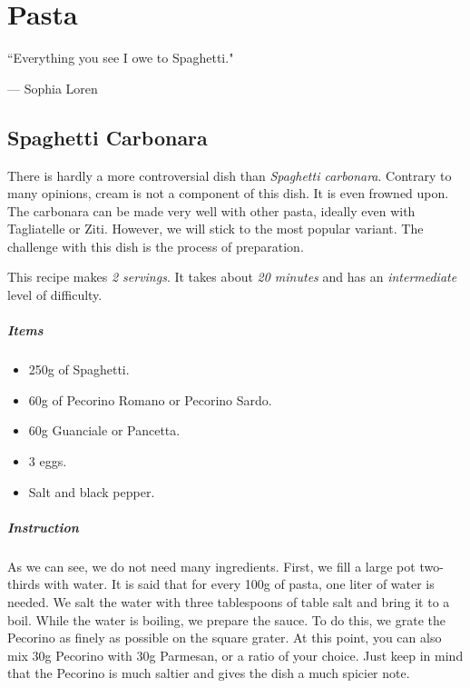\chapter{Pasta}
\label{pasta}
\epigraph{``Everything you see I owe to Spaghetti."}{--- \textup{Sophia Loren}}

\section{Spaghetti Carbonara}
\label{Spaghetticarbonara}
There is hardly a more controversial dish than \emph{Spaghetti carbonara}. Contrary to many opinions, cream is not a component of this dish. It is even frowned upon. The carbonara can be made very well with other pasta, ideally even with Tagliatelle or Ziti. However, we will stick to the most popular variant. The challenge with this dish is the process of preparation.

This recipe makes \emph{2 servings}. It takes about \emph{20 minutes} and has an \emph{intermediate} level of difficulty. 

\paragraph{Items}
\begin{itemize}[noitemsep]
    \item[\ding{182}] 250g of Spaghetti.
    \item[\ding{183}] 60g of Pecorino Romano or Pecorino Sardo.
    \item[\ding{184}] 60g Guanciale or Pancetta.
    \item[\ding{185}] 3 eggs.
    \item[\ding{186}] Salt and black pepper.
\end{itemize}

\paragraph{Instruction} 
As we can see, we do not need many ingredients. First, we fill a large pot two-thirds with water. It is said that for every 100g of pasta, one liter of water is needed. We salt the water with three tablespoons of table salt and bring it to a boil. While the water is boiling, we prepare the sauce. To do this, we grate the Pecorino as finely as possible on the square grater. At this point, you can also mix 30g Pecorino with 30g Parmesan, or a ratio of your choice. Just keep in mind that the Pecorino is much saltier and gives the dish a much spicier note.


